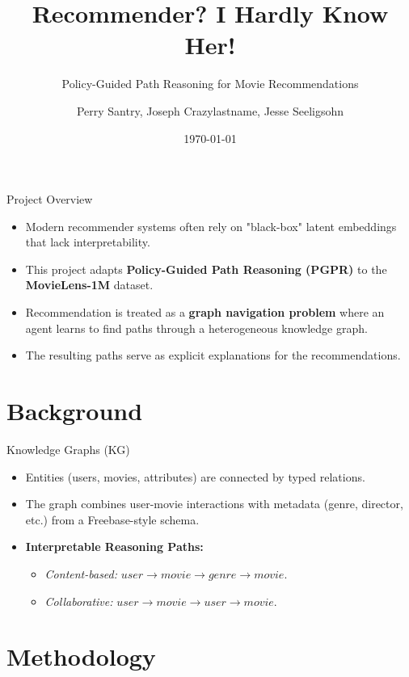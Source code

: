 \documentclass[10pt]{beamer}
\title{Recommender? I Hardly Know Her!}
\subtitle{Policy-Guided Path Reasoning for Movie Recommendations}
\date{\today}
\author{Perry Santry, Joseph Crazylastname, Jesse Seeligsohn}
\institute{Comp 579 Project --- McGill University}
\begin{document}
\maketitle

\begin{frame}{Project Overview}
    \begin{itemize}
        \item Modern recommender systems often rely on "black-box" latent embeddings that lack interpretability.
        \item This project adapts \textbf{Policy-Guided Path Reasoning (PGPR)} to the \textbf{MovieLens-1M} dataset.
        \item Recommendation is treated as a \textbf{graph navigation problem} where an agent learns to find paths through a heterogeneous knowledge graph.
        \item The resulting paths serve as explicit explanations for the recommendations.
    \end{itemize}
\end{frame}

\section{Background}

\begin{frame}{Knowledge Graphs (KG)}
    \begin{itemize}
        \item Entities (users, movies, attributes) are connected by typed relations.
        \item The graph combines user-movie interactions with metadata (genre, director, etc.) from a Freebase-style schema.
        \item \textbf{Interpretable Reasoning Paths:}
        \begin{itemize}
            \item \textit{Content-based:} $user \to movie \to genre \to movie$.
            \item \textit{Collaborative:} $user \to movie \to user \to movie$.
        \end{itemize}
    \end{itemize}
\end{frame}

\section{Methodology}
\end{document}
